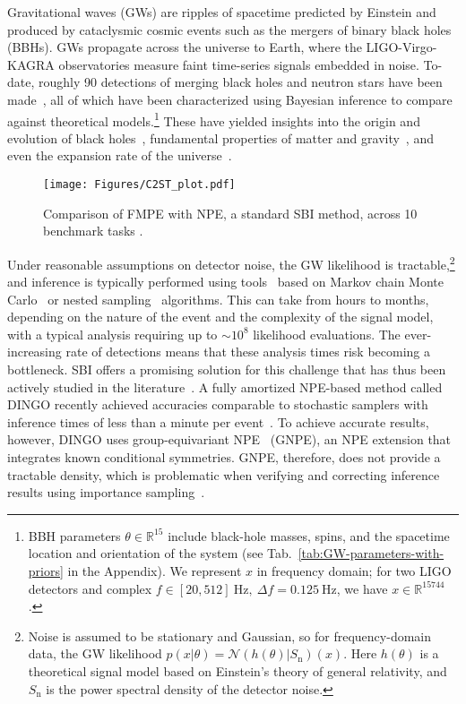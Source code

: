 \documentclass{article}
\theoremstyle{remark}
\begin{document}
Gravitational waves (GWs) are ripples of spacetime predicted by Einstein and produced by cataclysmic cosmic events such as the mergers of binary black holes (BBHs). GWs propagate across the universe to Earth, where the LIGO-Virgo-KAGRA observatories measure faint time-series signals embedded in noise. To-date, roughly 90 detections of merging black holes and neutron stars have been made~\cite{LIGOScientific:2021djp}, all of which have been characterized using Bayesian inference to compare against theoretical models.\footnote{BBH parameters $\theta\in\mathbb{R}^{15}$ include black-hole masses, spins, and the spacetime location and orientation of the system (see Tab.~\ref{tab:GW-parameters-with-priors} in the Appendix). We represent $x$ in frequency domain; for two LIGO detectors and complex $f\in[20,512]~\text{Hz},~\Delta f = 0.125~\text{Hz}$, we have $x\in\mathbb{R}^{15744}$.} These have yielded insights into the origin and evolution of black holes~\citep{LIGOScientific:2020kqk}, fundamental properties of matter and gravity~\citep{LIGOScientific:2018cki,LIGOScientific:2020tif}, and even the expansion rate of the universe~\citep{LIGOScientific:2017adf}.
\begin{figure}
  \vspace{-5pt}
  \centering
  \texttt{[image: Figures/C2ST\_plot.pdf]}
  \vspace{-5pt}
  \caption{\label{fig:benchmark-c2st}
  Comparison of FMPE with NPE, a standard SBI method, across 10 benchmark tasks  \cite{lueckmann2021benchmarking}. 
  }
\end{figure}
Under reasonable assumptions on detector noise, the GW likelihood is tractable,\footnote{Noise is assumed to be stationary and Gaussian, so for frequency-domain data, the GW likelihood $p(x|\theta) = \mathcal{N}(h(\theta) | S_{\mathrm{n}})(x)$. Here $h(\theta)$ is a theoretical signal model based on Einstein's theory of general relativity, and $S_{\mathrm{n}}$ is the power spectral density of the detector noise.} and inference is typically performed using tools~\cite{Veitch:2014wba,Ashton:2018jfp,Romero-Shaw:2020owr,Speagle_2020} based on Markov chain Monte Carlo~\cite{metropolis1953equation,Hastings:1970} or nested sampling~\cite{Skilling:2006} algorithms. This can take from hours to months, depending on the nature of the event and the complexity of the signal model, with a typical analysis requiring up to $\sim 10^8$ likelihood evaluations. The ever-increasing rate of detections means that these analysis times risk becoming a bottleneck. SBI offers a promising solution for this challenge that has thus been actively studied in the literature~\cite{Cuoco:2020ogp,Gabbard:2019rde,Green:2020hst,Delaunoy:2020zcu,Green:2020dnx,Dax:2021tsq,Dax:2021myb,Chatterjee:2022ggk,Dax:2022pxd}. A fully amortized NPE-based method called DINGO recently achieved accuracies comparable to stochastic samplers with inference times of less than a minute per event~\cite{Dax:2021tsq}. To achieve accurate results, however, DINGO uses group-equivariant NPE~\cite{Dax:2021tsq,Dax:2021myb} (GNPE), an NPE extension that integrates known conditional symmetries. GNPE, therefore, does not provide a tractable density, which is problematic when verifying and correcting inference results using importance sampling~\cite{Dax:2022pxd}. 
\end{document}
